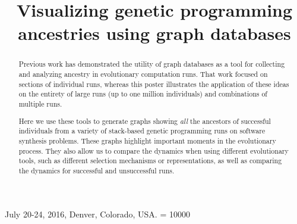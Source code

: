 \documentclass{sig-alternate}
\begin{document}
 {July 20-24, 2016, Denver, Colorado, USA.}
\widowpenalty = 10000

\title{Visualizing genetic programming ancestries using graph databases}


\maketitle

\begin{abstract}

Previous work has demonstrated the utility of graph databases as a tool for collecting and analyzing ancestry in evolutionary computation runs. That work focused on sections of individual runs, whereas this poster illustrates the application of these ideas on the entirety of large runs (up to one million individuals) and combinations of multiple runs.

Here we use these tools to generate graphs showing \emph{all} the ancestors of successful individuals from a variety of stack-based genetic programming runs on software synthesis problems. These graphs highlight important moments in the evolutionary process. They also allow us to compare the dynamics when using different evolutionary tools, such as different selection mechanisms or representations, as well as comparing the dynamics for successful and unsuccessful runs.

\end{abstract}
\end{document}
